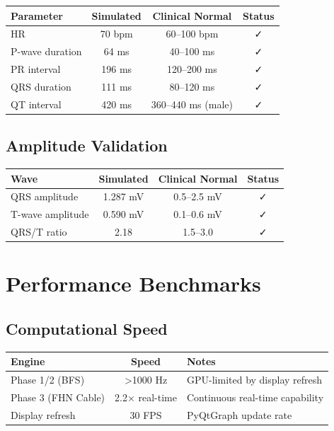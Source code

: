 \documentclass[11pt, a4paper]{article}
\begin{document}
\begin{tabularx}{\textwidth}{|l|c|c|c|}
\hline
\textbf{Parameter} & \textbf{Simulated} & \textbf{Clinical Normal} & \textbf{Status} \\
\hline
HR & 70 bpm & 60--100 bpm & ✓ \\
P-wave duration & 64 ms & 40--100 ms & ✓ \\
PR interval & 196 ms & 120--200 ms & ✓ \\
QRS duration & 111 ms & 80--120 ms & ✓ \\
QT interval & 420 ms & 360--440 ms (male) & ✓ \\
\hline
\end{tabularx}

\subsection{Amplitude Validation}

\begin{tabularx}{\textwidth}{|l|c|c|c|}
\hline
\textbf{Wave} & \textbf{Simulated} & \textbf{Clinical Normal} & \textbf{Status} \\
\hline
QRS amplitude & 1.287 mV & 0.5--2.5 mV & ✓ \\
T-wave amplitude & 0.590 mV & 0.1--0.6 mV & ✓ \\
QRS/T ratio & 2.18 & 1.5--3.0 & ✓ \\
\hline
\end{tabularx}

\section{Performance Benchmarks}

\subsection{Computational Speed}

\begin{tabularx}{\textwidth}{|l|c|l|}
\hline
\textbf{Engine} & \textbf{Speed} & \textbf{Notes} \\
\hline
Phase 1/2 (BFS) & >1000 Hz & GPU-limited by display refresh \\
Phase 3 (FHN Cable) & 2.2× real-time & Continuous real-time capability \\
Display refresh & 30 FPS & PyQtGraph update rate \\
\hline
\end{tabularx}
\end{document}
